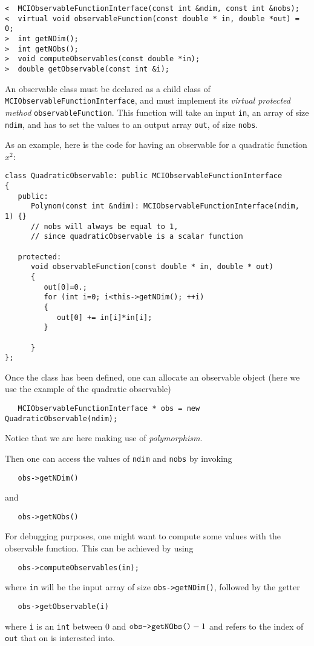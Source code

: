 \documentclass[11pt,a4paper,twoside]{article}
\begin{document}
\begin{verbatim}
<  MCIObservableFunctionInterface(const int &ndim, const int &nobs);
<  virtual void observableFunction(const double * in, double *out) = 0;
>  int getNDim();
>  int getNObs();
>  void computeObservables(const double *in);
>  double getObservable(const int &i);
\end{verbatim}

An observable class must be declared as a child class of \verb+MCIObservableFunctionInterface+, and must implement its \emph{virtual protected method} \verb+observableFunction+.
This function will take an input \verb+in+, an array of size \verb+ndim+, and has to set the values to an output array \verb+out+, of size \verb+nobs+.

As an example, here is the code for having an observable for a quadratic function $x^2$:
\begin{verbatim}
class QuadraticObservable: public MCIObservableFunctionInterface
{
   public:
      Polynom(const int &ndim): MCIObservableFunctionInterface(ndim, 1) {}
      // nobs will always be equal to 1,
      // since quadraticObservable is a scalar function

   protected:
      void observableFunction(const double * in, double * out)
      {
         out[0]=0.;
         for (int i=0; i<this->getNDim(); ++i)
         {
            out[0] += in[i]*in[i];
         }

      }
};
\end{verbatim}

Once the class has been defined, one can allocate an observable object (here we use the example of the quadratic observable)
\begin{verbatim}
   MCIObservableFunctionInterface * obs = new QuadraticObservable(ndim);
\end{verbatim}
Notice that we are here making use of \emph{polymorphism}.

Then one can access the values of \verb+ndim+ and \verb+nobs+ by invoking
\begin{verbatim}
   obs->getNDim()
\end{verbatim}
and
\begin{verbatim}
   obs->getNObs()
\end{verbatim}

For debugging purposes, one might want to compute some values with the observable function.
This can be achieved by using
\begin{verbatim}
   obs->computeObservables(in);
\end{verbatim}
where \verb+in+ will be the input array of size \verb+obs->getNDim()+, followed by the getter
\begin{verbatim}
   obs->getObservable(i)
\end{verbatim}
where \verb+i+ is an \verb+int+ between $0$ and $\verb+obs->getNObs()+ - 1$ and refers to the index of \verb+out+ that on is interested into.
\end{document}
